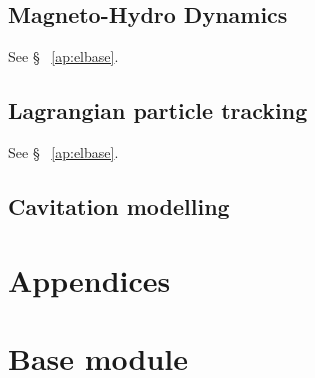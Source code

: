 \documentclass[a4paper,10pt,twoside]{csdoc}
\newcounter{prog}[part]
\begin{document}
\chapter{Magneto-Hydro Dynamics}
See \S~ \ref{ap:elbase}.

\chapter{Lagrangian particle tracking}
See \S~ \ref{ap:elbase}.




\chapter{Cavitation modelling}

%
\appendix

\part{Appendices}
\setcounter{section}{0}
\setcounter{equation}{0}
\setcounter{figure}{0}


\part{Base module}





















\end{document}
